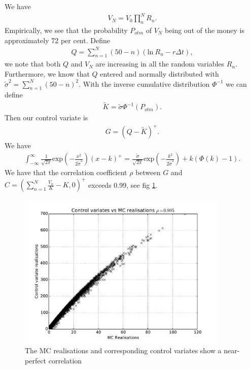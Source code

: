 \documentclass[a4paper,11pt]{article}
\newcommand{\expf}[1]{\mathrm{exp}\left ( {#1}\right )}
\newcommand{\parent}[1]{\left( {#1} \right)}
\newcommand{\ssum}[2]{\displaystyle\sum\limits_{#1}^{#2}}
\newcommand{\pprod}[2]{\displaystyle\prod\limits_{#1}^{#2}}
\begin{document}
We have
\begin{align}
V_N=V_0 \pprod{n}{N} R_n.
\end{align}
Empirically, we see that the probability $P_{otm}$ of $V_N$ being out of the money is
approximately 72 per cent.
Define
\begin{align}
Q = \ssum{n=1}{N} \parent{50-n} \parent{\mathrm{ln}~R_n - r \Delta t},
\end{align}
we note that both $Q$ and $V_N$ are increasing in all the random variables
$R_n$. Furthermore, we know that $Q$ entered and normally distributed with
$\tilde \sigma^2 = \ssum{n=1}{N} \parent{50-n}^2$. With the inverse cumulative distribution
$\Phi^{-1}$ we can define
\begin{align}
\tilde K = \tilde \sigma \Phi^{-1} \parent{P_{otm}}.
\end{align}
Then our control variate is
\begin{align}
G=\parent{Q-\tilde K}^+.
\end{align}
We have
\begin{align}
\int_{-\infty}^{\infty} \frac{1}{\sqrt{2 \pi}} \expf{-\frac{x^2}{2 \tilde \sigma^2}} \parent{x-k}^+
 =
 \frac{\tilde \sigma}{\sqrt{2 \pi}}
 \expf{-\frac{k^2}{2 \tilde \sigma^2}}
 +k \parent{\Phi \parent{k} -1}.
\end{align}
We have that the correlation coefficient $\rho$ between 
$G$ and $C = \parent{\ssum{n=1}{N}\frac{V_n}{K}-K,0}^+$
exceeds 0.99, see fig \ref{cvfig}.
\begin{figure}
\begin{center}
\includegraphics[width=100mm]{./cvplot.pdf}
\end{center}
\caption{
\label{cvfig}
The MC realisations and corresponding
control variates show a near-perfect correlation
}
\end{figure}
\end{document}

